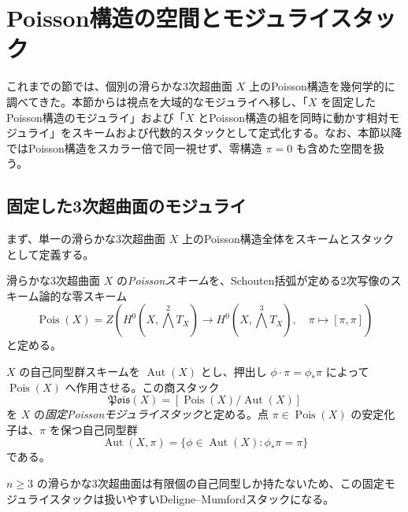 \section{Poisson構造の空間とモジュライスタック}
\label{sec:pg-poisson-stacks}

これまでの節では、個別の滑らかな3次超曲面 $X$ 上のPoisson構造を幾何学的に調べてきた。本節からは視点を大域的なモジュライへ移し、「$X$ を固定したPoisson構造のモジュライ」および「$X$ とPoisson構造の組を同時に動かす相対モジュライ」をスキームおよび代数的スタックとして定式化する。なお、本節以降ではPoisson構造をスカラー倍で同一視せず、零構造 $\pi=0$ も含めた空間を扱う。

\subsection{固定した3次超曲面のモジュライ}
まず、単一の滑らかな3次超曲面 $X$ 上のPoisson構造全体をスキームとスタックとして定義する。

\begin{definition}\label{def:pg-pois-space}
滑らかな3次超曲面 $X$ の\emph{Poissonスキーム}を、Schouten括弧が定める2次写像のスキーム論的な零スキーム
\begin{equation}\label{eq:pg-pois-space}
\operatorname{Pois}(X)=Z\left(
H^0(X,\bigwedge^2T_X)\longrightarrow H^0(X,\bigwedge^3T_X),
\quad\pi\longmapsto[\pi,\pi]\right)
\end{equation}
と定める。
\end{definition}

\begin{definition}\label{def:pg-fixed-pois-stack}
$X$ の自己同型群スキームを $\operatorname{Aut}(X)$ とし、押出し $\phi\cdot\pi=\phi_*\pi$ によって $\operatorname{Pois}(X)$ へ作用させる。この商スタック
\begin{equation}\label{eq:pg-fixed-pois-stack}
\mathfrak{Pois}(X)=[\operatorname{Pois}(X)/\operatorname{Aut}(X)]
\end{equation}
を $X$ の\emph{固定Poissonモジュライスタック}と定める。点 $\pi\in\operatorname{Pois}(X)$ の安定化子は、$\pi$ を保つ自己同型群
\begin{equation}\label{eq:pg-poisson-aut}
\operatorname{Aut}(X,\pi)
=\{\phi\in\operatorname{Aut}(X):\phi_*\pi=\pi\}
\end{equation}
である。
\end{definition}

$n\ge3$ の滑らかな3次超曲面は有限個の自己同型しか持たないため、この固定モジュライスタックは扱いやすいDeligne--Mumfordスタックになる。

